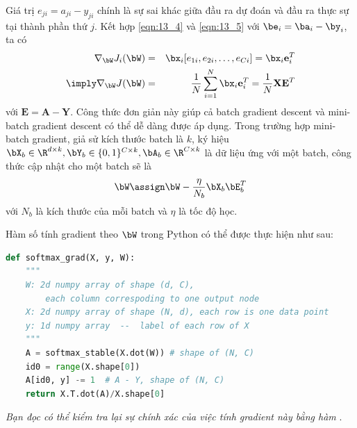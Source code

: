 Giá trị $e_{ji} = a_{ji} - y_{ji}$ chính là sự sai khác giữa đầu ra dự đoán và
đầu ra thực sự tại thành phần thứ $j$. Kết hợp \eqref{eqn:13_4} và
\eqref{eqn:13_5} với $\be_i = \ba_i - \by_i$, ta có
\begin{eqnarray} 
\nabla_{\bW}J_i(\bW)
&=& \bx_i [e_{1i}, e_{2i}, \dots, e_{Ci}] = \bx_i\mathbf{e}_i^T \\
\imply \nabla_{\bW}J(\bW)
&=& \frac{1}{N}\sum_{i=1}^N
\bx_i\mathbf{e}_i^T = \frac{1}{N}\mathbf{X}\mathbf{E}^T 
\end{eqnarray} 
với $\mathbf{E} = \mathbf{A - Y}$. Công thức đơn giản này giúp cả batch gradient descent và mini-batch gradient descent có thể dễ dàng
được áp dụng. Trong trường hợp mini-batch gradient, giả sử kích thước batch là
$k$, ký hiệu $\bX_b \in \R^{d \times k}, \bY_b \in \{0, 1\}^{C \times k},
\bA_b \in \R^{C \times k}$ là dữ liệu ứng với một batch, công thức cập nhật cho
một batch sẽ là
\begin{equation}
    \bW \assign \bW - \frac{\eta}{N_b}\bX_b\bE_b^T
\end{equation}
với $N_b$ là kích thước của mỗi batch và $\eta$ là tốc độ học. 

Hàm số tính gradient theo $\bW$ trong Python có thể được thực hiện như sau:
\begin{lstlisting}[language=Python]
def softmax_grad(X, y, W):
    """
    W: 2d numpy array of shape (d, C), 
        each column correspoding to one output node
    X: 2d numpy array of shape (N, d), each row is one data point
    y: 1d numpy array  --  label of each row of X 
    """
    A = softmax_stable(X.dot(W)) # shape of (N, C)
    id0 = range(X.shape[0])
    A[id0, y] -= 1  # A - Y, shape of (N, C)
    return X.T.dot(A)/X.shape[0]
\end{lstlisting}
\textit{Bạn đọc có thể kiểm tra lại sự chính xác của việc tính gradient này bằng hàm }. 

